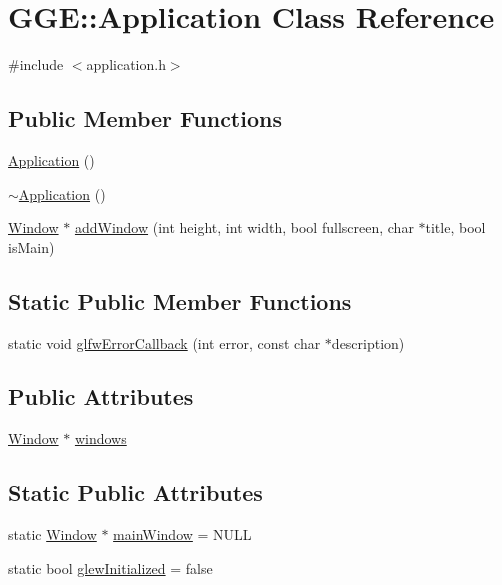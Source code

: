 \hypertarget{class_g_g_e_1_1_application}{\section{G\+G\+E\+:\+:Application Class Reference}
\label{class_g_g_e_1_1_application}
}


{\ttfamily \#include $<$application.\+h$>$}

\subsection*{Public Member Functions}
\begin{DoxyCompactItemize}
\item 
\hyperlink{class_g_g_e_1_1_application_ab30339d40c6eea9ddc818fb7b7f0b127}{Application} ()
\item 
\hyperlink{class_g_g_e_1_1_application_aa61a2e40680e004d1af303c9b81bd109}{$\sim$\+Application} ()
\item 
\hyperlink{class_g_g_e_1_1_window}{Window} $\ast$ \hyperlink{class_g_g_e_1_1_application_a403820d97ee74e9bab85743e651a8c8c}{add\+Window} (int height, int width, bool fullscreen, char $\ast$title, bool is\+Main)
\end{DoxyCompactItemize}
\subsection*{Static Public Member Functions}
\begin{DoxyCompactItemize}
\item 
static void \hyperlink{class_g_g_e_1_1_application_acc3c35b614352705a8e11567abba31b2}{glfw\+Error\+Callback} (int error, const char $\ast$description)
\end{DoxyCompactItemize}
\subsection*{Public Attributes}
\begin{DoxyCompactItemize}
\item 
\hyperlink{class_g_g_e_1_1_window}{Window} $\ast$ \hyperlink{class_g_g_e_1_1_application_afac18c3566e0934960cf292bef534fe6}{windows}
\end{DoxyCompactItemize}
\subsection*{Static Public Attributes}
\begin{DoxyCompactItemize}
\item 
static \hyperlink{class_g_g_e_1_1_window}{Window} $\ast$ \hyperlink{class_g_g_e_1_1_application_a9c9cce3ea5902ce5c8fac386d4592e41}{main\+Window} = N\+U\+L\+L
\item 
static bool \hyperlink{class_g_g_e_1_1_application_a3aa0cfc5ba81457e511130b8fddb0788}{glew\+Initialized} = false
\end{DoxyCompactItemize}
